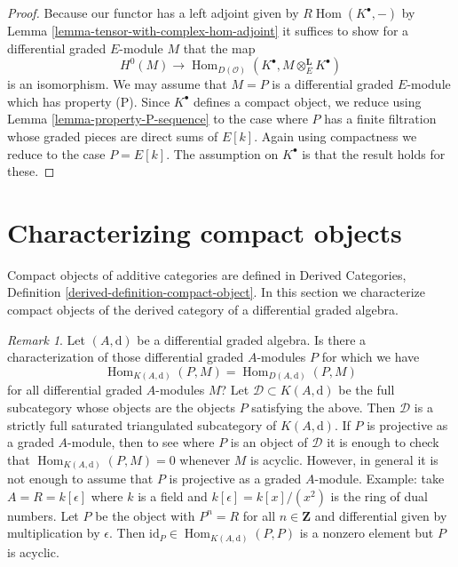 \documentclass{stacks-project}
\theoremstyle{plain}
\theoremstyle{definition}
\theoremstyle{remark}
\newtheorem{remark}[subsection]{Remark}
\numberwithin{equation}{subsection}
\def\Hom{\mathop{\mathrm{Hom}}\nolimits}
\begin{document}
\begin{proof}
Because our functor has a left adjoint given by
$R\Hom(K^\bullet, -)$ by Lemma \ref{lemma-tensor-with-complex-hom-adjoint}
it suffices to show for a differential graded $E$-module $M$ that the map
$$
H^0(M) \longrightarrow
\Hom_{D(\mathcal{O})}(K^\bullet, M \otimes_E^\mathbf{L} K^\bullet)
$$
is an isomorphism. We may assume that $M = P$ is a differential graded
$E$-module which has property (P). Since $K^\bullet$ defines a
compact object, we reduce using
Lemma \ref{lemma-property-P-sequence}
to the case where $P$ has a finite filtration whose graded pieces
are direct sums of $E[k]$. Again using compactness we reduce
to the case $P = E[k]$. The assumption on $K^\bullet$ is that
the result holds for these.
\end{proof}











\section{Characterizing compact objects}
\label{section-compact}

\noindent
Compact objects of additive categories are defined in
Derived Categories, Definition \ref{derived-definition-compact-object}.
In this section we characterize compact objects of the derived
category of a differential graded algebra.

\begin{remark}
\label{remark-source-graded-projective}
Let $(A, \text{d})$ be a differential graded algebra. Is there a
characterization of those differential graded $A$-modules $P$
for which we have
$$
\Hom_{K(A, \text{d})}(P, M) =  \Hom_{D(A, \text{d})}(P, M)
$$
for all differential graded $A$-modules $M$? Let
$\mathcal{D} \subset K(A, \text{d})$ be the full subcategory
whose objects are the objects $P$ satisfying the above. Then $\mathcal{D}$
is a strictly full saturated triangulated subcategory of $K(A, \text{d})$.
If $P$ is projective as a graded $A$-module, then to see where $P$
is an object of $\mathcal{D}$ it is enough to check that
$\Hom_{K(A, \text{d})}(P, M) = 0$ whenever $M$ is acyclic.
However, in general it is not enough to assume that $P$ is projective as
a graded $A$-module. Example: take $A = R = k[\epsilon]$ where $k$ is
a field and $k[\epsilon] = k[x]/(x^2)$ is the ring of dual numbers.
Let $P$ be the object with $P^n = R$ for all $n \in \mathbf{Z}$
and differential given by multiplication by $\epsilon$. Then
$\text{id}_P \in \Hom_{K(A, \text{d})}(P, P)$ is a nonzero element
but $P$ is acyclic.
\end{remark}
\end{document}
